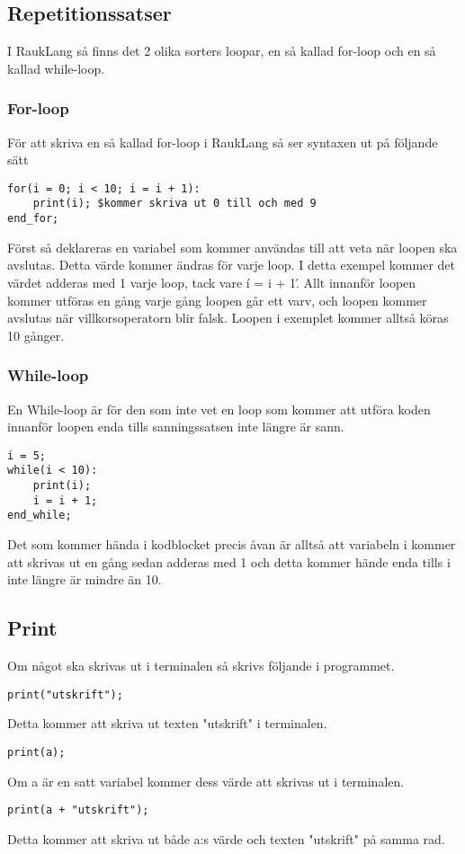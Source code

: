 \documentclass[12pt]{TDP019}
\begin{document}
\subsection{Repetitionssatser}
I RaukLang så finns det 2 olika sorters loopar, en så kallad for-loop och en så kallad while-loop.
\subsubsection{For-loop}
För att skriva en så kallad for-loop i RaukLang så ser syntaxen ut på följande sätt
\begin{verbatim}
for(i = 0; i < 10; i = i + 1):
    print(i); $kommer skriva ut 0 till och med 9
end_for;
\end{verbatim}
Först så deklareras en variabel som kommer användas till att veta när loopen ska avslutas. Detta värde kommer ändras för varje loop. I detta exempel kommer det värdet adderas med 1 varje loop, tack vare \'i = i + 1\'. Allt innanför loopen kommer utföras en gång varje gång loopen går ett varv, och loopen kommer avslutas när villkorsoperatorn blir falsk. Loopen i exemplet kommer alltså köras 10 gånger.
\subsubsection{While-loop}
En While-loop är för den som inte vet en loop som kommer att utföra koden innanför loopen enda tills sanningssatsen inte längre är sann.
\begin{verbatim}
i = 5;
while(i < 10):
    print(i);
    i = i + 1;
end_while;
\end{verbatim}
Det som kommer hända i kodblocket precis åvan är alltså att variabeln i kommer att skrivas ut en gång sedan adderas med 1 och detta kommer hände enda tills i inte längre är mindre än 10. 
\subsection{Print}
Om något ska skrivas ut i terminalen så skrivs följande i programmet.
\begin{verbatim}
print("utskrift");
\end{verbatim}
Detta kommer att skriva ut texten "utskrift" i terminalen.
\begin{verbatim}
print(a);
\end{verbatim}
Om a är en satt variabel kommer dess värde att skrivas ut i terminalen.
\begin{verbatim}
print(a + "utskrift");  
\end{verbatim}
Detta kommer att skriva ut både a:s värde och texten "utskrift" på samma rad.
\end{document}
